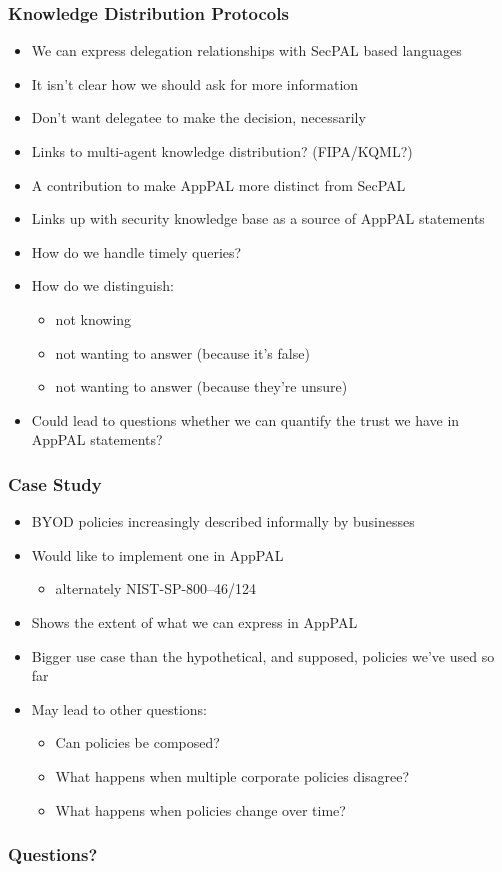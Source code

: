 \documentclass{beamer}
\begin{document}
\begin{frame}
  \frametitle{Knowledge Distribution Protocols}
  \begin{itemize}
  \item We can express delegation relationships with SecPAL based languages
  \item It isn't clear how we should ask for more information
  \item Don't want delegatee to make the decision, necessarily
  \item Links to multi-agent knowledge distribution? (FIPA/KQML?)
  \end{itemize}
  \begin{itemize}
  \item A contribution to make AppPAL more distinct from SecPAL
  \item Links up with security knowledge base as a source of AppPAL statements
  \item How do we handle timely queries?
  \item How do we distinguish:
    \begin{itemize}
    \item not knowing
    \item not wanting to answer (because it's false)
    \item not wanting to answer (because they're unsure)
    \end{itemize}
  \item Could lead to questions whether we can quantify the trust we have in AppPAL statements?  
  \end{itemize}
\end{frame}

\begin{frame}
  \frametitle{Case Study}
  \begin{itemize}
  \item BYOD policies increasingly described informally by businesses
  \item Would like to implement one in AppPAL
    \begin{itemize}
    \item alternately NIST-SP-800--46/124
    \end{itemize}
    \item Shows the extent of what we can express in AppPAL
    \item Bigger use case than the hypothetical, and supposed, policies we've
      used so far
    \item May lead to other questions:
      \begin{itemize}
      \item Can policies be composed?
      \item What happens when multiple corporate policies disagree?
      \item What happens when policies change over time?
      \end{itemize}
  \end{itemize}
\end{frame}

\begin{frame}
  \frametitle{Questions?}
  
\end{frame}
\end{document}
